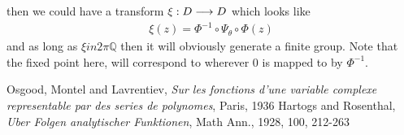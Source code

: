 \documentclass{unswmaths}
\begin{document}
then we could have a transform $ \xi : D \longrightarrow D $ which looks like
\begin{align}
	\xi(z) = \Phi^{-1} \circ \Psi_{\theta} \circ \Phi(z)
\end{align}
and as long as $ \xi in 2\pi\mathbb{Q} $ then it will obviously generate a finite group. Note that the fixed point here, will correspond to wherever $ 0 $ is mapped to by $ \Phi^{-1} $. 

\begin{thebibliography}{9}

	Osgood, Montel and Lavrentiev,
	\emph{Sur les fonctions d'une variable complexe representable par des series de polynomes},
	Paris,
	1936
	Hartogs and Rosenthal,
	\emph{Uber Folgen analytischer Funktionen},
	Math Ann.,
	1928,
	100,
	212-263
\end{thebibliography}
\end{document}
